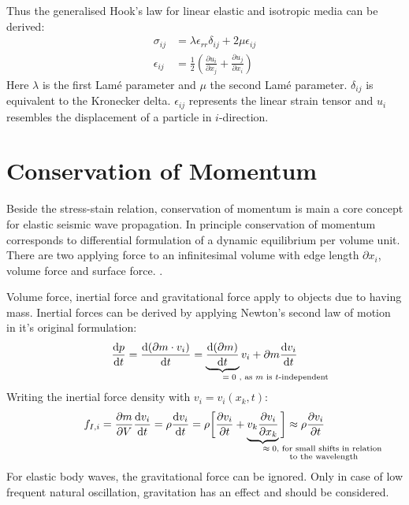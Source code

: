 \documentclass[pdftex,a4paper,parskip,listof=totoc,bibliography=totoc,onehalfspacing,12pt]{scrreprt}
\begin{document}
Thus the generalised Hook's law for linear elastic and isotropic media can be derived:
\begin{align}
	\sigma_{ij} &= \lambda \epsilon_{rr} \delta_{ij} + 2 \mu \epsilon_{ij}\label{eqn:GenHook}\\
	\epsilon_{ij} &= \frac{1}{2} \left( \frac{\partial u_i}{\partial x_j} + \frac{\partial u_j}{\partial x_i} \right)\label{eqn:Dehnij}
\end{align}
Here $\lambda$ is the first Lam\'{e} parameter and $\mu$ the second Lam\'{e} parameter. $\delta_{ij}$ is equivalent to the Kronecker delta. $\epsilon_{ij}$ represents the linear strain tensor and $u_i$ resembles the displacement of a particle in $i$-direction.

\section{Conservation of Momentum}

Beside the stress-stain relation, conservation of momentum is main a core concept for elastic seismic wave propagation. In principle conservation of momentum corresponds to differential formulation of a dynamic equilibrium per volume unit. There are two applying force to an infinitesimal volume with edge length $\partial x_i$, volume force and surface force. \citep{landau1997lehrbuch}.

Volume force, inertial force and gravitational force apply to objects due to having mass. 
Inertial forces can be derived by applying Newton's  second law of motion in it's original formulation: 
\begin{equation}
	\frac{\mathrm{d} p}{\mathrm{d} t} = \frac{\mathrm{d} (\partial m \cdot v_i)}{\mathrm{d} t} = \underbrace{\frac{\mathrm{d} (\partial m)}{\mathrm{d} t}}_{\mathrlap{\text{$= 0$ , as $m$ is $t$-independent}}} v_i + \partial m \frac{\mathrm{d} v_i}{\mathrm{d} t}
\end{equation}
Writing the inertial force density with $v_i = v_i (x_k,t)$:
\begin{equation}
	f_{I,i} = \frac{\partial m}{\partial V} \frac{\mathrm{d} v_i}{\mathrm{d} t} = \rho \frac{\mathrm{d} v_i}{\mathrm{d} t} = \rho \bigg[ \frac{\partial v_i}{\partial t} + \underbrace{v_k \frac{\partial v_i}{\partial x_k}}_{\mathrlap{\substack{\text{$\approx 0$, for small shifts in relation}\\\text{ to the wavelength}}}} \bigg] \approx \rho \frac{\partial v_i}{\partial t}\label{eqn:TKD}
\end{equation}
For elastic body waves, the gravitational force can be ignored. Only in case of low frequent natural oscillation, gravitation has an effect and should be considered.
\end{document}
